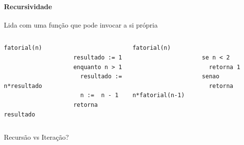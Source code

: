 \begin{frame}[fragile,label=graduacao]
	\framesubtitle{Recursividade}
	
	Lida com uma função que pode invocar a si própria
	\vspace{-.7\baselineskip}
	\begin{columns}[T]
			\begin{lstlisting}[title=Fatorial iterativo]
				fatorial(n)
				    resultado := 1
				    enquanto n > 1
				      resultado := n*resultado
				      n :=  n - 1
				    retorna resultado
			\end{lstlisting}
			\pause
			\begin{lstlisting}[title=Fatorial recursivo]
				fatorial(n)
				    se n < 2
				      retorna 1
				    senao
				      retorna n*fatorial(n-1)
			\end{lstlisting}
	\end{columns}
	\vfill\pause
	Recursão vs Iteração?
\end{frame}

